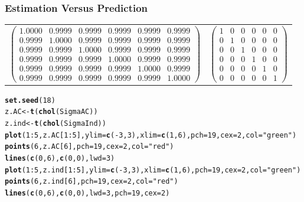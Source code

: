 \documentclass[mathserif,compress]{beamer}\usepackage{graphicx, color}
\makeatletter
\newcommand{\hlfunctioncall}[1]{\textcolor[rgb]{0.501960784313725,0,0.329411764705882}{\textbf{#1}}}%
\newcommand{\hlstring}[1]{\textcolor[rgb]{0.6,0.6,1}{#1}}%
\newenvironment{kframe}{%
 \def\at@end@of@kframe{}%
 \ifinner\ifhmode%
  \def\at@end@of@kframe{\end{minipage}}%
  \begin{minipage}{\columnwidth}%
 \fi\fi%
 \def\FrameCommand##1{\hskip\@totalleftmargin \hskip-\fboxsep
 \colorbox{shadecolor}{##1}\hskip-\fboxsep
     \hskip-\linewidth \hskip-\@totalleftmargin \hskip\columnwidth}%
 \MakeFramed {\advance\hsize-\width
   \@totalleftmargin\z@ \linewidth\hsize
   \@setminipage}}%
 {\par\unskip\endMakeFramed%
 \at@end@of@kframe}
\newenvironment{knitrout}{}{} %
\makeatother
\begin{document}
\begin{frame} [fragile]
\frametitle{Estimation Versus Prediction}
\tiny
	\vspace{.2cm}
	\begin{tabular} {p{4.5cm} p{4.5cm}}
		$\left(\begin{array}{rrrrrr}
				1.0000 & 0.9999 & 0.9999 & 0.9999 & 0.9999 & 0.9999 \\ 
				0.9999 & 1.0000 & 0.9999 & 0.9999 & 0.9999 & 0.9999 \\ 
				0.9999 & 0.9999 & 1.0000 & 0.9999 & 0.9999 & 0.9999 \\ 
				0.9999 & 0.9999 & 0.9999 & 1.0000 & 0.9999 & 0.9999 \\ 
				0.9999 & 0.9999 & 0.9999 & 0.9999 & 1.0000 & 0.9999 \\ 
				0.9999 & 0.9999 & 0.9999 & 0.9999 & 0.9999 & 1.0000  
		\end{array}\right)$ &
		\hspace{1.5cm} $\left(\begin{array}{rrrrrr}
				1 & 0 & 0 & 0 & 0 & 0 \\ 
				0 & 1 & 0 & 0 & 0 & 0 \\ 
				0 & 0 & 1 & 0 & 0 & 0 \\ 
				0 & 0 & 0 & 1 & 0 & 0 \\ 
				0 & 0 & 0 & 0 & 1 & 0 \\ 
				0 & 0 & 0 & 0 & 0 & 1 
 		\end{array}\right)$ 
	\end{tabular}
\begin{knitrout}\tiny
{}\color{fgcolor}\begin{kframe}
\begin{alltt}
\hlfunctioncall{set.seed}(18)
z.AC <- \hlfunctioncall{t}(\hlfunctioncall{chol}(SigmaAC)) %
z.ind <- \hlfunctioncall{t}(\hlfunctioncall{chol}(SigmaInd)) %
\hlfunctioncall{plot}(1:5, z.AC[1:5], ylim = \hlfunctioncall{c}(-3, 3), xlim = \hlfunctioncall{c}(1, 6), pch = 19, cex = 2, col = \hlstring{"green"})
\hlfunctioncall{points}(6, z.AC[6], pch = 19, cex = 2, col = \hlstring{"red"})
\hlfunctioncall{lines}(\hlfunctioncall{c}(0, 6), \hlfunctioncall{c}(0, 0), lwd = 3)
\hlfunctioncall{plot}(1:5, z.ind[1:5], ylim = \hlfunctioncall{c}(-3, 3), xlim = \hlfunctioncall{c}(1, 6), pch = 19, cex = 2, col = \hlstring{"green"})
\hlfunctioncall{points}(6, z.ind[6], pch = 19, cex = 2, col = \hlstring{"red"})
\hlfunctioncall{lines}(\hlfunctioncall{c}(0, 6), \hlfunctioncall{c}(0, 0), lwd = 3, pch = 19, cex = 2)
\end{alltt}
\end{kframe}
\end{knitrout}




\end{frame}
\end{document}
